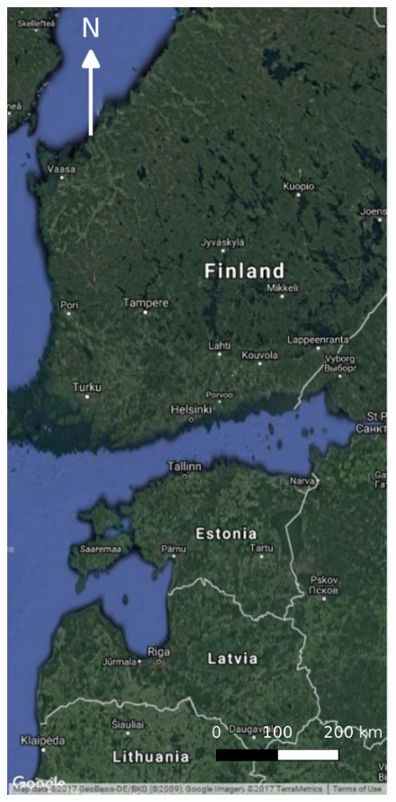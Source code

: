 \documentclass[20pt]{beamer}
\begin{document}
\begin{frame}{}
\begin{textblock}{7}
		\begin{figure}
		  \includegraphics[width=2.3\TPHorizModule]{../thesis/thesis-figures/figures-qgis/fulltile-google}

\end{figure}
\end{textblock}
\end{frame}
\end{document}
